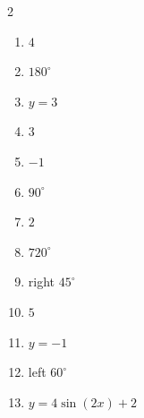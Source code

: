 \documentclass[11pt]{article}
\begin{document}
\begin{keybox}
\begin{multicols}{2}
\small
\begin{enumerate}[leftmargin=*,itemsep=3pt]
  \item $4$
  \item $180^\circ$
  \item $y=3$
  \item $3$
  \item $-1$
  \item $90^\circ$
  \item $2$
  \item $720^\circ$
  \item right $45^\circ$
  \item $5$
  \item $y=-1$
  \item left $60^\circ$
  \item $y=4\sin(2x)+2$
\end{enumerate}
\end{multicols}
\end{keybox}
\end{document}
